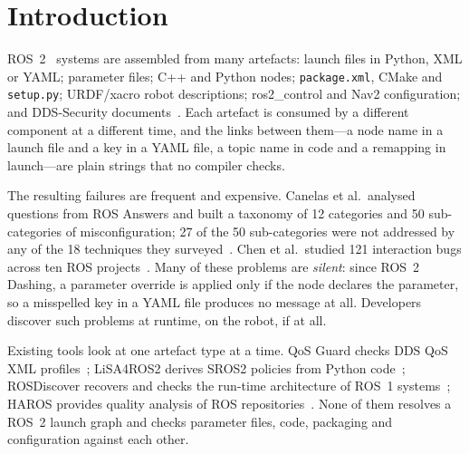 ﻿\documentclass[conference]{IEEEtran}
\newcommand{\code}[1]{\texttt{#1}}
\begin{document}
\section{Introduction}

ROS~2~\cite{macenski2022ros2} systems are assembled from many artefacts: launch files in
Python, XML or YAML; parameter files; C++ and Python nodes; \code{package.xml}, CMake and
\code{setup.py}; URDF/xacro robot descriptions; ros2\_control and Nav2 configuration; and
DDS-Security documents~\cite{omg2015dds}. Each artefact is consumed by a different component
at a different time, and the links between them---a node name in a launch file and a key in a
YAML file, a topic name in code and a remapping in launch---are plain strings that no compiler
checks.

The resulting failures are frequent and expensive. Canelas et al.\ analysed questions from
ROS Answers and built a taxonomy of 12 categories and 50 sub-categories of misconfiguration;
27 of the 50 sub-categories were not addressed by any of the 18 techniques they
surveyed~\cite{canelas2024misconfig}. Chen et al.\ studied 121 interaction bugs across ten ROS
projects~\cite{chen2025ibugs}. Many of these problems are \emph{silent}: since ROS~2 Dashing,
a parameter override is applied only if the node declares the parameter, so a misspelled key
in a YAML file produces no message at all. Developers discover such problems at
runtime, on the robot, if at all.

Existing tools look at one artefact type at a time. QoS Guard checks DDS QoS XML
profiles~\cite{lee2025qosguard}; LiSA4ROS2 derives SROS2 policies from Python
code~\cite{zanatta2024lisa}; ROSDiscover recovers and checks the run-time architecture of ROS~1
systems~\cite{timperley2022rosdiscover}; HAROS provides quality analysis of ROS
repositories~\cite{santos2016haros,santos2021haros}. None of them resolves a ROS~2 launch graph
and checks parameter files, code, packaging and configuration against each other.
\end{document}
